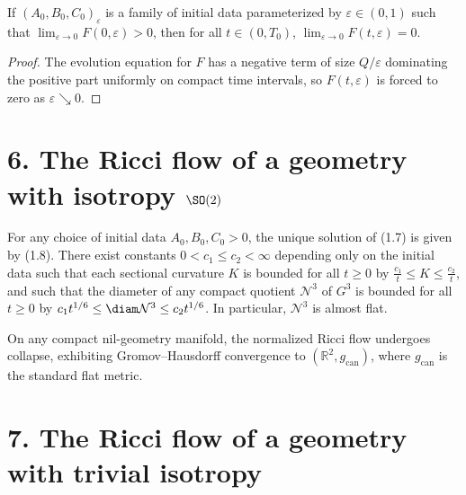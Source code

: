 \begin{lemma}
\label{ch01-lem-collapse-discontinuity}
If $(A_0,B_0,C_0)_\varepsilon$ is a family of initial data parameterized by $\varepsilon\in(0,1)$ such that $\lim_{\varepsilon\to 0}F(0,\varepsilon)>0$, then for all $t\in(0,T_0)$, $\lim_{\varepsilon\to 0}F(t,\varepsilon)=0$.
\end{lemma}

\begin{proof}
\sketch The evolution equation for $F$ has a negative term of size $Q/\varepsilon$ dominating the positive part uniformly on compact time intervals, so $F(t,\varepsilon)$ is forced to zero as $\varepsilon\searrow 0$.
\end{proof}

\section*{6. The Ricci flow of a geometry with isotropy $\SO(2)$}

\begin{proposition}
\label{ch01-prop-nil}
For any choice of initial data $A_0,B_0,C_0 > 0$, the unique solution of (1.7) is given by (1.8). There exist constants $0 < c_1 \leq c_2 < \infty$ depending only on the initial data such that each sectional curvature $K$ is bounded for all $t \geq 0$ by $\frac{c_1}{t} \leq K \leq \frac{c_2}{t}$, and such that the diameter of any compact quotient $\mathcal{N}^3$ of $G^3$ is bounded for all $t \geq 0$ by $c_1 t^{1/6} \leq \diam \mathcal{N}^3 \leq c_2 t^{1/6}$. In particular, $\mathcal{N}^3$ is almost flat.
\end{proposition}

\begin{corollary}
\label{ch01-cor-nil-collapse}
On any compact nil-geometry manifold, the normalized Ricci flow undergoes collapse, exhibiting Gromov--Hausdorff convergence to $(\mathbb{R}^2,g_{\mathrm{can}})$, where $g_{\mathrm{can}}$ is the standard flat metric.
\end{corollary}

\section*{7. The Ricci flow of a geometry with trivial isotropy}

